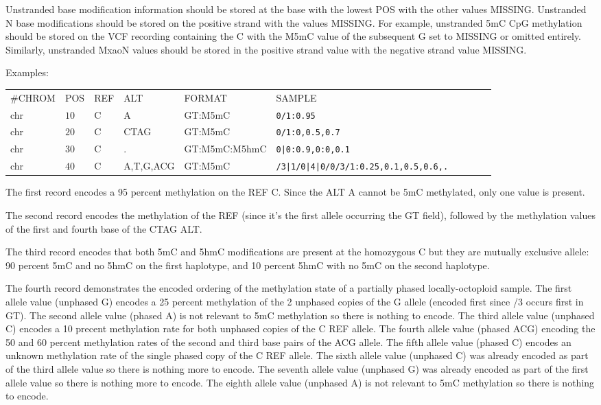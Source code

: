 \documentclass[8pt]{article}
\begin{document}
Unstranded base modification information should be stored at the base with the lowest POS with the other values MISSING.
Unstranded N base modifications should be stored on the positive strand with the values MISSING.
For example, unstranded 5mC CpG methylation should be stored on the VCF recording containing the C with the M5mC value of the subsequent G set to MISSING or omitted entirely. Similarly, unstranded MxaoN values should be stored in the positive strand value with the negative strand value MISSING.

Examples: 

\vspace{0.5em}
\begin{tabular}{ l l l l l l l l l l}
	\#CHROM & POS & REF & ALT & FORMAT & SAMPLE\\
	chr & $10$ & C & A         & GT:M5mC       & \tt{0/1:0.95}\\
	chr & $20$ & C & CTAG      & GT:M5mC       & \tt{0/1:0,0.5,0.7}\\
	chr & $30$ & C & .         & GT:M5mC:M5hmC & \tt{0|0:0.9,0:0,0.1}\\
	chr & $40$ & C & A,T,G,ACG & GT:M5mC       & \tt{/3|1/0|4|0/0/3/1:0.25,0.1,0.5,0.6,.}\\
\end{tabular}

The first record encodes a 95 percent methylation on the REF C.
Since the ALT A cannot be 5mC methylated, only one value is present.

The second record encodes the methylation of the REF (since it's the first allele occurring the GT field), followed by the methylation values of the first and fourth base of the CTAG ALT.

The third record encodes that both 5mC and 5hmC modifications are present at the homozygous C but they are mutually exclusive allele: 90 percent 5mC and no 5hmC on the first haplotype, and 10 percent 5hmC with no 5mC on the second haplotype.

The fourth record demonstrates the encoded ordering of the methylation state of a partially phased locally-octoploid sample.
The first   allele value (unphased G) encodes a 25 percent methylation of the 2 unphased copies of the G allele (encoded first since /3 occurs first in GT).
The second  allele value (phased A)   is not relevant to 5mC methylation so there is nothing to encode.
The third   allele value (unphased C) encodes a 10 precent methylation rate for both unphased copies of the C REF allele.
The fourth  allele value (phased ACG) encoding the 50 and 60 percent methylation rates of the second and third base pairs of the ACG allele.
The fifth   allele value (phased C)   encodes an unknown methylation rate of the single phased copy of the C REF allele.
The sixth   allele value (unphased C) was already encoded as part of the third allele value so there is nothing more to encode.
The seventh allele value (unphased G) was already encoded as part of the first allele value so there is nothing more to encode.
The eighth  allele value (unphased A) is not relevant to 5mC methylation so there is nothing to encode.
\end{document}
